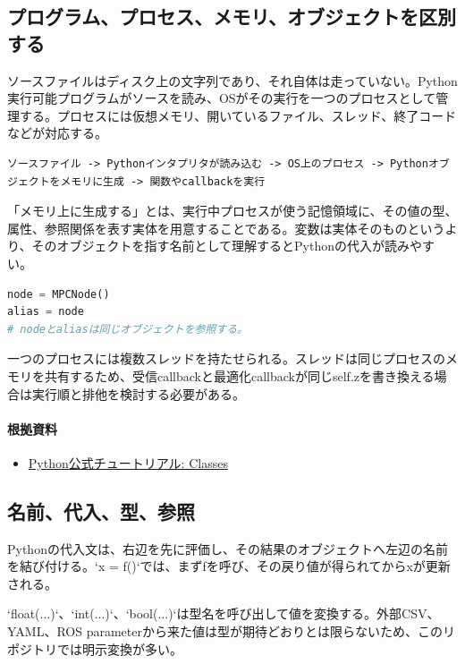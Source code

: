 \documentclass[a4paper,11pt]{article}
\begin{document}
        \subsection{プログラム、プロセス、メモリ、オブジェクトを区別する}
ソースファイルはディスク上の文字列であり、それ自体は走っていない。Python実行可能プログラムがソースを読み、OSがその実行を一つのプロセスとして管理する。プロセスには仮想メモリ、開いているファイル、スレッド、終了コードなどが対応する。


\begin{lstlisting}
ソースファイル -> Pythonインタプリタが読み込む -> OS上のプロセス -> Pythonオブジェクトをメモリに生成 -> 関数やcallbackを実行
\end{lstlisting}


「メモリ上に生成する」とは、実行中プロセスが使う記憶領域に、その値の型、属性、参照関係を表す実体を用意することである。変数は実体そのものというより、そのオブジェクトを指す名前として理解するとPythonの代入が読みやすい。


\begin{lstlisting}[language=python]
node = MPCNode()
alias = node
# nodeとaliasは同じオブジェクトを参照する。
\end{lstlisting}


一つのプロセスには複数スレッドを持たせられる。スレッドは同じプロセスのメモリを共有するため、受信callbackと最適化callbackが同じself.zを書き換える場合は実行順と排他を検討する必要がある。

\paragraph{根拠資料}
\begin{itemize}[leftmargin=1.6em]
\item \href{https://docs.python.org/3/tutorial/classes.html}{Python公式チュートリアル: Classes}
\end{itemize}

\subsection{名前、代入、型、参照}
Pythonの代入文は、右辺を先に評価し、その結果のオブジェクトへ左辺の名前を結び付ける。`x = f()`では、まずfを呼び、その戻り値が得られてからxが更新される。


`float(...)`、`int(...)`、`bool(...)`は型名を呼び出して値を変換する。外部CSV、YAML、ROS parameterから来た値は型が期待どおりとは限らないため、このリポジトリでは明示変換が多い。
\end{document}
